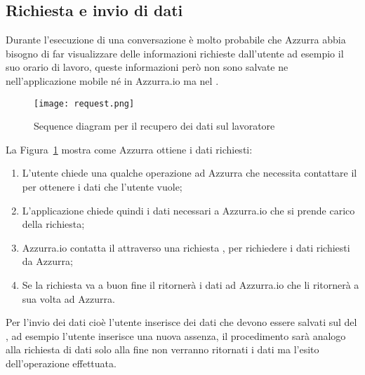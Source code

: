 \subsection{Richiesta e invio di dati}
Durante l'esecuzione di una conversazione è molto probabile che Azzurra abbia bisogno di far visualizzare delle informazioni richieste dall'utente ad esempio il suo orario di lavoro, queste informazioni però non sono salvate ne nell'applicazione mobile né in Azzurra.io ma nel .
\begin{figure}[h]
	\begin{center}
		\texttt{[image: request.png]}
		\caption{Sequence diagram per il recupero dei dati sul lavoratore}\label{fig:request}
	\end{center}
\end{figure}
La Figura~\ref{fig:request} mostra come Azzurra ottiene i dati richiesti:
\begin{enumerate}
	\item L'utente chiede una qualche operazione ad Azzurra che necessita contattare il  per ottenere i dati che l'utente vuole;
	\item L'applicazione chiede quindi i dati necessari a Azzurra.io che si prende carico della richiesta;
	\item Azzurra.io contatta il  attraverso una richiesta , per richiedere i dati richiesti da Azzurra;
	\item Se la richiesta va a buon fine il  ritornerà i dati ad Azzurra.io che li ritornerà a sua volta ad Azzurra.
\end{enumerate}
Per l'invio dei dati cioè l'utente inserisce dei dati che devono essere salvati sul  del , ad esempio l'utente inserisce una nuova assenza, il procedimento sarà analogo alla richiesta di dati solo alla fine non verranno ritornati i dati ma l'esito dell'operazione effettuata.
